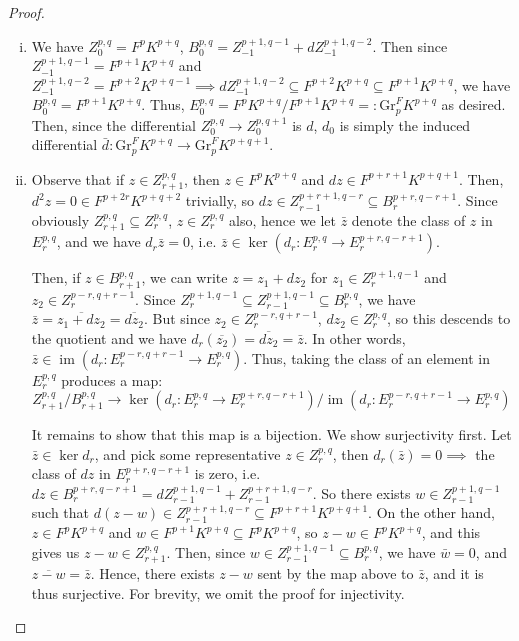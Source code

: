 \documentclass[11pt]{article}
\newcommand{\image}{\operatorname{im}}
\theoremstyle{definition}
\numberwithin{theorem}{section} %
\numberwithin{equation}{section} %
\begin{document}
\begin{proof}
    \begin{enumerate}[i.]
        \item We have $Z_0^{p,q} = F^pK^{p+q}$, $B_0^{p,q} = Z^{p+1,q-1}_{-1} + dZ^{p+1,q-2}_{-1}$. Then since $Z^{p+1,q-1}_{-1} = F^{p+1}K^{p+q}$ and $Z^{p+1,q-2}_{-1} = F^{p+2}K^{p+q-1} \implies dZ^{p+1,q-2}_{-1}\subseteq F^{p+2}K^{p+q} \subseteq F^{p+1}K^{p+q}$, we have $B_0^{p,q} =  F^{p+1}K^{p+q}$. Thus, $E_0^{p,q} = F^pK^{p+q}/F^{p+1}K^{p+q}=: \mathrm{Gr}_p^F K^{p+q}$ as desired. Then, since the differential $Z_0^{p,q}\to Z_0^{p,q+1}$ is $d$, $d_0$ is simply the induced differential $\bar{d}:\mathrm{Gr}_p^FK^{p+q}\to \mathrm{Gr}_p^F K^{p+q+1}$.  

        \item Observe that if $z\in Z_{r+1}^{p,q}$, then $z\in F^p K^{p+q}$ and $dz\in F^{p+r+1}K^{p+q+1}$. Then, $d^2z = 0\in F^{p+2r}K^{p+q+2}$ trivially, so $dz\in Z_{r-1}^{p+r+1,q-r} \subseteq B_r^{p+r, q-r+1}$. Since obviously $Z_{r+1}^{p,q}\subseteq Z_r^{p,q}$, $z\in Z_r^{p,q}$ also, hence we let $\bar z$ denote the class of $z$ in $E_r^{p,q}$, and we have $d_r\bar z = 0$, i.e. $\bar z\in \ker \left(d_r:E_r^{p,q} \to E_r^{p+r,q-r+1}\right)$. 

        \medskip
        
        Then, if $z \in B_{r+1}^{p,q}$, we can write $z=z_1+dz_2$ for $z_1 \in Z_r^{p+1,q-1}$ and $z_2\in Z_r^{p-r,q+r-1}$. Since $Z_r^{p+1,q-1}\subseteq Z_{r-1}^{p+1,q-1}\subseteq B_r^{p,q}$, we have $\bar{z} = \overline{z_1+dz_2} = \overline{dz_2}$. But since $z_2\in Z_r^{p-r,q+r-1}$, $dz_2 \in Z_r^{p,q}$, so this descends to the quotient and we have $d_r\left(\overline{z_2}\right) = \overline{dz_2} =\bar z$. In other words, $\bar z \in \image\left(d_r:E_r^{p-r,q+r-1} \to E_r^{p,q}\right)$. Thus, taking the class of an element in $E_r^{p,q}$ produces a map:
        $$
        Z_{r+1}^{p,q}/B_{r+1}^{p,q} \to \ker \left(d_r:E_r^{p,q} \to E_r^{p+r,q-r+1}\right) / \image\left(d_r:E_r^{p-r,q+r-1} \to E_r^{p,q}\right)
        $$
        
        It remains to show that this map is a bijection. We show surjectivity first. Let $\bar z \in \ker d_r$, and pick some representative $z\in Z_r^{p,q}$, then $d_r(\bar z) = 0 \implies$ the class of $dz$ in $E_r^{p+r,q-r+1}$ is zero, i.e. $dz \in B_r^{p+r,q-r+1} = dZ_{r-1}^{p+1,q-1} +Z_{r-1}^{p+r+1,q-r}$. So there exists $w\in Z_{r-1}^{p+1,q-1}$ such that $d(z-w) \in Z_{r-1}^{p+r+1,q-r}\subseteq F^{p+r+1}K^{p+q+1}$. On the other hand, $z\in F^pK^{p+q}$ and $w\in F^{p+1}K^{p+q} \subseteq F^pK^{p+q}$, so $z-w\in F^pK^{p+q}$, and this gives us $z-w\in Z_{r+1}^{p,q}$. Then, since $w\in Z_{r-1}^{p+1,q-1}\subseteq B_r^{p,q}$, we have $\bar w=0$, and $\overline{z-w} = \bar z$. Hence, there exists $z-w$ sent by the map above to $\bar z$, and it is thus surjective. For brevity, we omit the proof for injectivity. 


\end{enumerate}
\end{proof}
\end{document}
